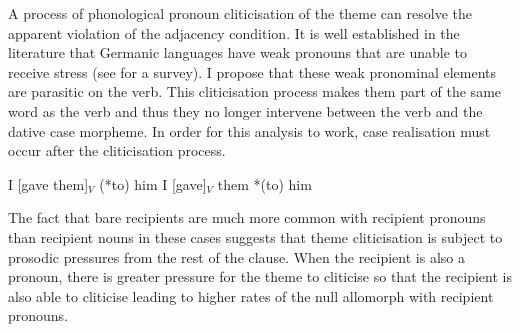 A process of phonological pronoun cliticisation of the theme can resolve the apparent violation of the adjacency condition. It is well established in the literature that Germanic languages have weak pronouns that are unable to receive stress (see \cite{Cardinaletti.1999} for a survey). I propose that these weak pronominal elements are parasitic on the verb. This cliticisation process makes them part of the same word as the verb and thus they no longer intervene between the verb and the dative case morpheme. In order for this analysis to work, case realisation must occur after the cliticisation process.
\begin{exe}
\ex 
\begin{xlist}
\ex I [gave them]$_{V}$ (*to) him
\ex I [gave]$_{V}$ them *(to) him
\end{xlist}
\end{exe}%
The fact that bare recipients are much more common with recipient pronouns than recipient nouns in these cases suggests that theme cliticisation is subject to prosodic pressures from the rest of the clause. When the recipient is also a pronoun, there is greater pressure for the theme to cliticise so that the recipient is also able to cliticise leading to higher rates of the null allomorph with recipient pronouns.



